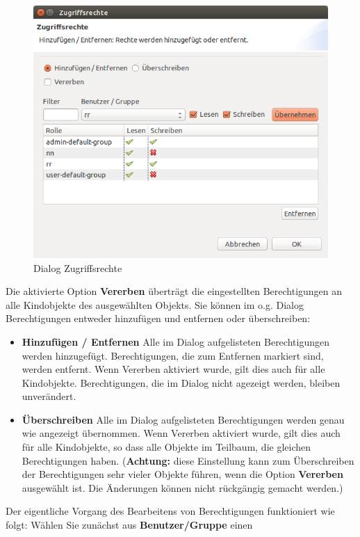 \documentclass[a4paper,10pt]{book}
\begin{document}
\begin{figure}[htb!]
  \centering
  \includegraphics[scale=.54]{Screenshot/zugriffsrechte-dialog.png}
  \caption{\label{Dialog Zugriffsrechte} Dialog Zugriffsrechte}
\end{figure}
\newline
Die aktivierte Option \textbf{Vererben} überträgt die eingestellten Berechtigungen an alle Kindobjekte des ausgewählten Objekts.
Sie können im o.g. Dialog Berechtigungen entweder hinzufügen und entfernen oder überschreiben:
\begin{itemize}
 \item \textbf{Hinzufügen / Entfernen}
    \subitem Alle im Dialog aufgelisteten Berechtigungen werden hinzugefügt. Berechtigungen, die zum Entfernen markiert sind, werden entfernt. Wenn Vererben aktiviert wurde, gilt dies auch für alle Kindobjekte. Berechtigungen, die im Dialog nicht agezeigt werden, bleiben unverändert.
 \item \textbf{Überschreiben}
    \subitem Alle im Dialog aufgelisteten Berechtigungen werden genau wie angezeigt übernommen.  Wenn Vererben aktiviert wurde, gilt dies auch für alle Kindobjekte, so dass alle Objekte im Teilbaum, die gleichen Berechtigungen haben. (\textbf{Achtung:} diese Einstellung kann zum Überschreiben der Berechtigungen sehr vieler Objekte führen, wenn die Option \textbf{Vererben} ausgewählt ist. Die Änderungen können nicht rückgängig gemacht werden.)
\end{itemize}
Der eigentliche Vorgang des Bearbeitens von Berechtigungen funktioniert wie folgt: Wählen Sie zunächst aus \textbf{Benutzer/Gruppe} einen
\end{document}
